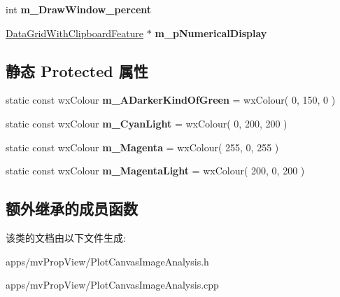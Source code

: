 \begin{DoxyCompactItemize}
\item 
\hypertarget{class_plot_canvas_image_analysis_a1e798314bc8af470088d36578091aef1}{int {\bfseries m\+\_\+\+Draw\+Window\+\_\+percent}}\label{class_plot_canvas_image_analysis_a1e798314bc8af470088d36578091aef1}

\item 
\hypertarget{class_plot_canvas_image_analysis_a712d539751651c7966fbd37b6fa9a3b7}{\hyperlink{class_data_grid_with_clipboard_feature}{Data\+Grid\+With\+Clipboard\+Feature} $\ast$ {\bfseries m\+\_\+p\+Numerical\+Display}}\label{class_plot_canvas_image_analysis_a712d539751651c7966fbd37b6fa9a3b7}

\end{DoxyCompactItemize}
\subsection*{静态 Protected 属性}
\begin{DoxyCompactItemize}
\item 
\hypertarget{class_plot_canvas_image_analysis_a77e37cf17edb450129ab91c2f129c413}{static const wx\+Colour {\bfseries m\+\_\+\+A\+Darker\+Kind\+Of\+Green} = wx\+Colour( 0, 150, 0 )}\label{class_plot_canvas_image_analysis_a77e37cf17edb450129ab91c2f129c413}

\item 
\hypertarget{class_plot_canvas_image_analysis_a39b79d6b419b36c392f3d960cad59e86}{static const wx\+Colour {\bfseries m\+\_\+\+Cyan\+Light} = wx\+Colour( 0, 200, 200 )}\label{class_plot_canvas_image_analysis_a39b79d6b419b36c392f3d960cad59e86}

\item 
\hypertarget{class_plot_canvas_image_analysis_ae4d90192b1e216f2b4edfb24d7fb6b90}{static const wx\+Colour {\bfseries m\+\_\+\+Magenta} = wx\+Colour( 255, 0, 255 )}\label{class_plot_canvas_image_analysis_ae4d90192b1e216f2b4edfb24d7fb6b90}

\item 
\hypertarget{class_plot_canvas_image_analysis_a082d9be1d0b8f73f2ece7b9c55c87d56}{static const wx\+Colour {\bfseries m\+\_\+\+Magenta\+Light} = wx\+Colour( 200, 0, 200 )}\label{class_plot_canvas_image_analysis_a082d9be1d0b8f73f2ece7b9c55c87d56}

\end{DoxyCompactItemize}
\subsection*{额外继承的成员函数}


该类的文档由以下文件生成\+:\begin{DoxyCompactItemize}
\item 
apps/mv\+Prop\+View/Plot\+Canvas\+Image\+Analysis.\+h\item 
apps/mv\+Prop\+View/Plot\+Canvas\+Image\+Analysis.\+cpp\end{DoxyCompactItemize}
